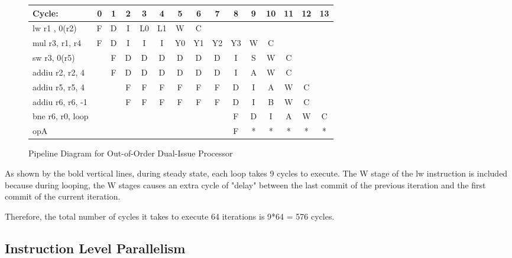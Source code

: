 \documentclass[10pt]{article}
\begin{document}
\begin{figure}[H]
\centering
{\setlength{\tabcolsep}{2pt}
\begin{tabular}{|l|c|c|c|c|c!{\vrule width 1.5pt}c|c|c|c|c|c|c|c|c!{\vrule width 1.5pt}}
\hline
Cycle:            & 0  & 1  & 2  & 3  & 4  & 5  & 6  & 7  & 8  & 9  & 10 & 11 & 12 & 13 \\ \hline
lw r1 , 0(r2)     & F  & D  & I  & L0 & L1 & W  & C  &    &    &    &    &    &    &    \\ \hline
mul r3, r1, r4    & F  & D  & I  & I  & I  & Y0 & Y1 & Y2 & Y3 & W  & C  &    &    &    \\ \hline
sw r3, 0(r5)      &    & F  & D  & D  & D  & D  & D  & D  & I  & S  & W  & C  &    &    \\ \hline
addiu r2, r2, 4   &    & F  & D  & D  & D  & D  & D  & D  & I  & A  & W  & C  &    &    \\ \hline
addiu r5, r5, 4   &    &    & F  & F  & F  & F  & F  & F  & D  & I  & A  & W  & C  &    \\ \hline
addiu r6, r6, -1  &    &    & F  & F  & F  & F  & F  & F  & D  & I  & B  & W  & C  &    \\ \hline
bne r6, r0, loop  &    &    &    &    &    &    &    &    & F  & D  & I  & A  & W  & C  \\ \hline
opA               &    &    &    &    &    &    &    &    & F  & *  & *  & *  & *  & *  \\ \hline
\end{tabular}
}
\caption{Pipeline Diagram for Out-of-Order Dual-Issue Processor}
\end{figure}
As shown by the bold vertical lines, during steady state, each loop takes 9 cycles to execute. The W stage of the lw instruction is included because during looping, the W stages causes an extra cycle of "delay" between the last commit of the previous iteration and the first commit of the current iteration.

Therefore, the total number of cycles it takes to execute 64 iterations is 9*64 = 576 cycles.

\subsection{Instruction Level Parallelism}
\end{document}
